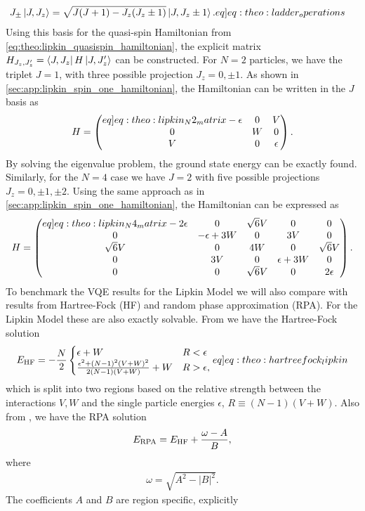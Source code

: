 \begin{align}
    J_\pm \ket{J,J_z} &= \sqrt{J(J+1)-J_z (J_z \pm 1)} \ket{J,J_z \pm 1}. \label[eq]{eq:theo:ladder_operations}
\end{align}
Using this basis for the quasi-spin Hamiltonian from \cref{eq:theo:lipkin_quasispin_hamiltonian}, the explicit matrix $H_{J_z,J'_z} = \bra{J,J_z} H \ket{J,J_z'}$ can be constructed. For $N=2$ particles, we have the triplet $J=1$, with three possible projection $J_z = 0, \pm 1$. As shown in \cref{sec:app:lipkin_spin_one_hamiltonian}, the Hamiltonian can be written in the $J$ basis as
\begin{align}
    H = \begin{pmatrix} \label[eq]{eq:theo:lipkin_N2_matrix}
        -\epsilon & 0 & V \\
        0 & W & 0 \\
        V & 0 & \epsilon
    \end{pmatrix}.
\end{align}
By solving the eigenvalue problem, the ground state energy can be exactly found. Similarly, for the $N=4$ case we have $J = 2$ with five possible projections $J_z = 0,\pm1,\pm2$. Using the same approach as in \cref{sec:app:lipkin_spin_one_hamiltonian}, the Hamiltonian can be expressed as  
\begin{align}
    H = \begin{pmatrix}\label[eq]{eq:theo:lipkin_N4_matrix}
        -2\epsilon & 0  & \sqrt{6}V &0 &0 \\
        0 & -\epsilon + 3W & 0 & 3V & 0 \\
        \sqrt{6}V & 0 & 4W & 0 & \sqrt{6}V \\
        0 & 3V & 0 & \epsilon + 3W & 0 \\
        0 & 0 & \sqrt{6}V & 0 & 2\epsilon
    \end{pmatrix}.
\end{align}
To benchmark the VQE results for the Lipkin Model we will also compare with results from Hartree-Fock (HF) and random phase approximation (RPA). For the Lipkin Model these are also exactly solvable. From \citep{coHartreeFockRandom2015} we have the Hartree-Fock solution
\begin{align}
    \EHF = -\frac{N}{2}\begin{cases}
        \epsilon + W & R < \epsilon \\
        \frac{\epsilon^2 + (N-1)^2 (V+W)^2 }{2(N-1)(V+W)} + W & R > \epsilon,
    \end{cases} \label[eq]{eq:theo:hartreefock_lipkin}
\end{align}
which is split into two regions based on the relative strength between the interactions $V,W$ and the single particle energies $\epsilon$, $R \equiv (N-1)(V+W)$. Also from \citep{coHartreeFockRandom2015}, we have the RPA solution
\begin{align}
    E_{\text{RPA}} = E_{\text{HF}} + \frac{\omega - A}{B},
\end{align}
where
\begin{align*}
    \omega = \sqrt{A^2 - |B|^2}.
\end{align*}
The coefficients $A$ and $B$ are region specific, explicitly

